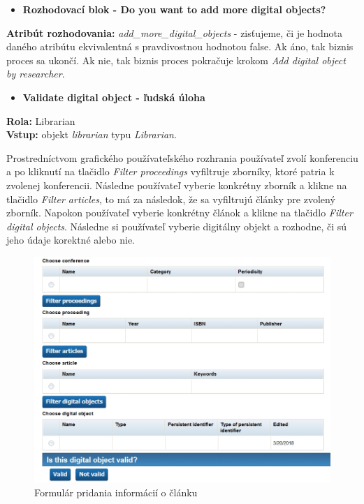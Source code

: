 \documentclass[10pt,oneside,slovak,a4paper]{article}
\begin{document}
\begin{itemize}
\item \textbf{Rozhodovací blok - Do you want to add more digital objects?}
\end{itemize}

\textbf{Atribút rozhodovania:} \textit{add\_more\_digital\_objects} - zisťujeme, či je hodnota daného atribútu ekvivalentná s pravdivostnou hodnotou false. Ak áno, tak biznis proces sa ukončí. Ak nie, tak biznis proces pokračuje krokom \textit{Add digital object by researcher}.

\begin{itemize}
\item \textbf{Validate digital object
 - ľudská úloha}
\end{itemize}

\textbf{Rola:} Librarian\\
\textbf{Vstup:} objekt \textit{librarian} typu \textit{Librarian}.

Prostredníctvom grafického používateľského rozhrania používateľ zvolí konferenciu a po kliknutí na tlačidlo \textit{Filter proceedings} vyfiltruje zborníky, ktoré patria k zvolenej konferencii. Následne používateľ vyberie konkrétny zborník a klikne na tlačidlo \textit{Filter articles}, to má za následok, že sa vyfiltrujú články pre zvolený zborník. Napokon používateľ vyberie konkrétny článok a klikne na tlačidlo \textit{Filter digital objects}. Následne si používateľ vyberie digitálny objekt a rozhodne, či sú jeho údaje korektné alebo nie.

\begin{figure} [H]
\centering
\includegraphics[scale=0.4]{forms/formValidation.jpg} 
\caption{Formulár pridania informácií o článku}
\end{figure}
\end{document}
